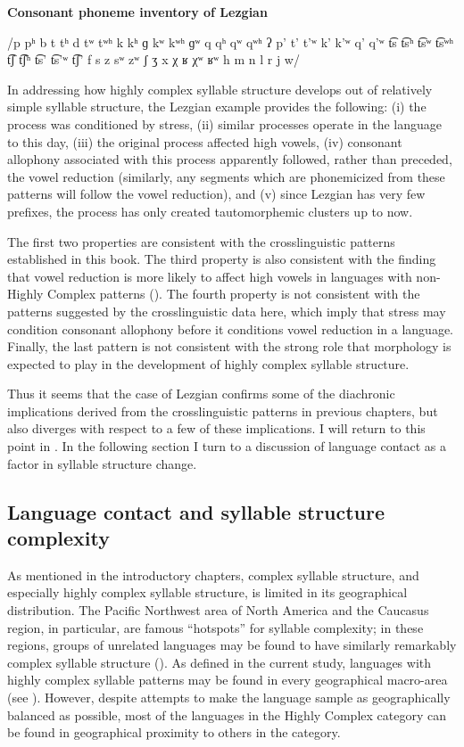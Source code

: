 \ea\label{ex:8.4}
  \textbf{Consonant phoneme inventory of Lezgian}

/p pʰ b t tʰ d tʷ tʷʰ k kʰ ɡ kʷ kʷʰ ɡʷ q qʰ qʷ qʷʰ ʔ p’ t’ t’ʷ k’ k’ʷ q’ q’ʷ t͡s t͡sʰ t͡sʷ t͡sʷʰ t͡ʃ t͡ʃʰ t͡s’ t͡s’ʷ t͡ʃ’ f s z sʷ zʷ ʃ ʒ x χ ʁ χʷ ʁʷ h m n l r j w/
\z

  In addressing how highly complex syllable structure develops out of relatively simple syllable structure, the Lezgian example provides the following: (i) the process was conditioned by stress, (ii) similar processes operate in the language to this day, (iii) the original process affected high vowels, (iv) consonant allophony associated with this process apparently followed, rather than preceded, the vowel reduction (similarly, any segments which are phonemicized from these patterns will follow the vowel reduction), and (v) since Lezgian has very few prefixes, the process has only created tautomorphemic clusters up to now. 

  The first two properties are consistent with the crosslinguistic patterns established in this book. The third property is also consistent with the finding that vowel reduction is more likely to affect high vowels in languages with non-Highly Complex patterns (). The fourth property is not consistent with the patterns suggested by the crosslinguistic data here, which imply that stress may condition consonant allophony before it conditions vowel reduction in a language. Finally, the last pattern is not consistent with the strong role that morphology is expected to play in the development of highly complex syllable structure.

  Thus it seems that the case of Lezgian confirms some of the diachronic implications derived from the crosslinguistic patterns in previous chapters, but also diverges with respect to a few of these implications. I will return to this point in . In the following section I turn to a discussion of language contact as a factor in syllable structure change.

\subsection{Language contact and syllable structure complexity}\label{sec:8.4.5}

  As mentioned in the introductory chapters, complex syllable structure, and especially highly complex syllable structure, is limited in its geographical distribution. The Pacific Northwest area of North America and the Caucasus region, in particular, are famous ``hotspots'' for syllable complexity; in these regions, groups of unrelated languages may be found to have similarly remarkably complex syllable structure (\citealt{Chirikba2008,ThompsonKinkade1990}). As defined in the current study, languages with highly complex syllable patterns may be found in every geographical macro-area (see ). However, despite attempts to make the language sample as geographically balanced as possible, most of the languages in the Highly Complex category can be found in geographical proximity to others in the category.

